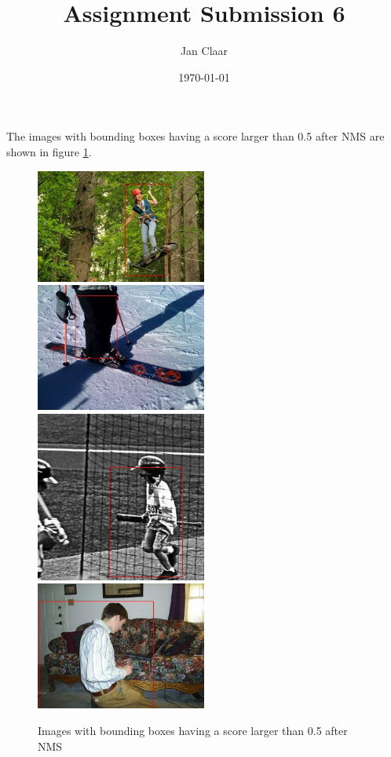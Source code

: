 \documentclass[
    headings=optiontohead,              %
    12pt,                               %
    DIV=13,                             %
    twoside=false,                      %
    open=right,                         %
    BCOR=00mm,                          %
    toc=bibliographynumbered,            %
    parskip=half,                       %
]{scrarticle}
\title{Assignment Submission 6}
\author{Jan Claar}
\date{\today}
\begin{document}
    \head 


    The images with bounding boxes having a score larger than 0.5 after NMS are shown in figure \ref{fig:6.1}.
    \begin{figure}[htpb]
        \centering
        \includegraphics[width=0.5\textwidth]{../00057796_nms.jpg}
        \includegraphics[width=0.5\textwidth]{../00139983_nms.jpg}
        \includegraphics[width=0.5\textwidth]{../00150614_nms.jpg}
        \includegraphics[width=0.5\textwidth]{../00569021_nms.jpg}
        \caption{Images with bounding boxes having a score larger than 0.5 after NMS}
        \label{fig:6.1}
    \end{figure}
    
\end{document}
